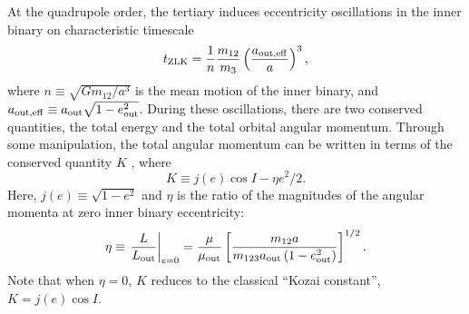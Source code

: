 \documentclass[
        fleqn,
        usenatbib,
    ]{mnras}
\newcommand*{\at}[1]{\left.#1\right|}
\newcommand*{\p}[1]{\left(#1\right)}
\newcommand*{\s}[1]{\left[#1\right]}
\begin{document}
At the quadrupole order, the tertiary induces eccentricity oscillations in the
inner binary on characteristic timescale
\begin{equation}
    t_{\rm ZLK} = \frac{1}{n}\frac{m_{12}}{m_3}
            \p{\frac{a_{\rm out, eff}}{a}}^3,\label{eq:def_tzlk}
\end{equation}
where $n \equiv \sqrt{Gm_{12} / a^3}$ is the mean motion of the inner binary,
and $a_{\rm out, eff} \equiv a_{\rm out}\sqrt{1 - e_{\rm out}^2}$. During these
oscillations, there are two conserved quantities, the total energy and the total
orbital angular momentum. Through some manipulation, the total angular momentum
can be written in terms of the conserved quantity $K$ \citep{LML15}, where
\begin{equation}
    K \equiv j(e) \cos I - \eta e^2 / 2. \label{eq:def_K}
\end{equation}
Here, $j(e) \equiv \sqrt{1 - e^2}$ and $\eta$ is the ratio of the magnitudes of
the angular momenta at zero inner binary eccentricity:
\begin{equation}
    \eta \equiv \at{\frac{L}{L_{\rm out}}}_{e = 0}
        = \frac{\mu}{\mu_{\rm out}}\s{\frac{m_{12}a}
            {m_{123}a_{\rm out}\p{1 - e_{\rm out}^2}}}^{1/2}.\label{eq:def_eta}
\end{equation}
Note that when $\eta = 0$, $K$ reduces to the classical ``Kozai constant'', $K =
j(e) \cos I$.
\end{document}
